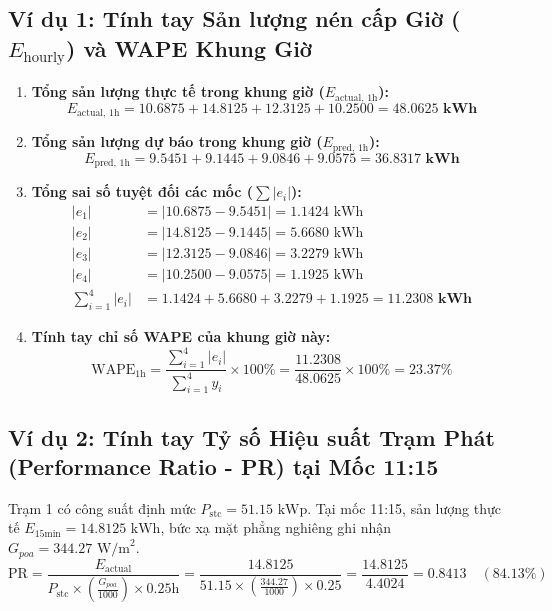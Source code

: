 \documentclass[12pt,a4paper]{article}
\begin{document}
\subsection{Ví dụ 1: Tính tay Sản lượng nén cấp Giờ ($E_{\text{hourly}}$) và WAPE Khung Giờ}
\begin{enumerate}
    \item \textbf{Tổng sản lượng thực tế trong khung giờ ($E_{\text{actual, 1h}}$):}
    \begin{equation}
        E_{\text{actual, 1h}} = 10.6875 + 14.8125 + 12.3125 + 10.2500 = \mathbf{48.0625 \text{ kWh}}
    \end{equation}

    \item \textbf{Tổng sản lượng dự báo trong khung giờ ($E_{\text{pred, 1h}}$):}
    \begin{equation}
        E_{\text{pred, 1h}} = 9.5451 + 9.1445 + 9.0846 + 9.0575 = \mathbf{36.8317 \text{ kWh}}
    \end{equation}

    \item \textbf{Tổng sai số tuyệt đối các mốc ($\sum |e_i|$):}
    \begin{align}
        |e_1| &= |10.6875 - 9.5451| = 1.1424 \text{ kWh} \\
        |e_2| &= |14.8125 - 9.1445| = 5.6680 \text{ kWh} \\
        |e_3| &= |12.3125 - 9.0846| = 3.2279 \text{ kWh} \\
        |e_4| &= |10.2500 - 9.0575| = 1.1925 \text{ kWh} \\
        \sum_{i=1}^{4} |e_i| &= 1.1424 + 5.6680 + 3.2279 + 1.1925 = \mathbf{11.2308 \text{ kWh}}
    \end{align}

    \item \textbf{Tính tay chỉ số WAPE của khung giờ này:}
    \begin{equation}
        \text{WAPE}_{\text{1h}} = \frac{\sum_{i=1}^{4} |e_i|}{\sum_{i=1}^{4} y_i} \times 100\% = \frac{11.2308}{48.0625} \times 100\% = \mathbf{23.37\%}
    \end{equation}
\end{enumerate}

\subsection{Ví dụ 2: Tính tay Tỷ số Hiệu suất Trạm Phát (Performance Ratio - PR) tại Mốc 11:15}
Trạm 1 có công suất định mức $P_{\text{stc}} = 51.15 \text{ kWp}$. Tại mốc 11:15, sản lượng thực tế $E_{\text{15min}} = 14.8125 \text{ kWh}$, bức xạ mặt phẳng nghiêng ghi nhận $G_{poa} = 344.27 \text{ W/m}^2$.
\begin{equation}
    \text{PR} = \frac{E_{\text{actual}}}{P_{\text{stc}} \times \left(\frac{G_{poa}}{1000}\right) \times 0.25 \text{h}} = \frac{14.8125}{51.15 \times \left(\frac{344.27}{1000}\right) \times 0.25} = \frac{14.8125}{4.4024} = \mathbf{0.8413} \quad (\mathbf{84.13\%})
\end{equation}
\end{document}
